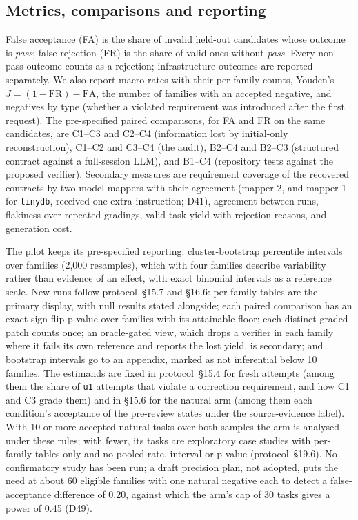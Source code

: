 \subsection{Metrics, comparisons and reporting}
\label{sec:metrics}
False acceptance (FA) is the share of invalid held-out candidates whose outcome is \emph{pass}; false rejection (FR) is the share of valid ones without \emph{pass}. Every non-pass outcome counts as a rejection; infrastructure outcomes are reported separately. We also report macro rates with their per-family counts, Youden's $J=(1-\mathrm{FR})-\mathrm{FA}$, the number of families with an accepted negative, and negatives by type (whether a violated requirement was introduced after the first request). The pre-specified paired comparisons, for FA and FR on the same candidates, are C1--C3 and C2--C4 (information lost by initial-only reconstruction), C1--C2 and C3--C4 (the audit), B2--C4 and B2--C3 (structured contract against a full-session LLM), and B1--C4 (repository tests against the proposed verifier). Secondary measures are requirement coverage of the recovered contracts by two model mappers with their agreement (mapper 2, and mapper 1 for \texttt{tinydb}, received one extra instruction; D41), agreement between runs, flakiness over repeated gradings, valid-task yield with rejection reasons, and generation cost.

The pilot keeps its pre-specified reporting: cluster-bootstrap percentile intervals over families (2,000 resamples), which with four families describe variability rather than evidence of an effect, with exact binomial intervals as a reference scale. New runs follow protocol~\S15.7 and \S16.6: per-family tables are the primary display, with null results stated alongside; each paired comparison has an exact sign-flip p-value over families with its attainable floor; each distinct graded patch counts once; an oracle-gated view, which drops a verifier in each family where it fails its own reference and reports the lost yield, is secondary; and bootstrap intervals go to an appendix, marked as not inferential below 10 families. The estimands are fixed in protocol~\S15.4 for fresh attempts (among them the share of \texttt{u1} attempts that violate a correction requirement, and how C1 and C3 grade them) and in \S15.6 for the natural arm (among them each condition's acceptance of the pre-review states under the source-evidence label). With 10 or more accepted natural tasks over both samples the arm is analysed under these rules; with fewer, its tasks are exploratory case studies with per-family tables only and no pooled rate, interval or p-value (protocol~\S19.6). No confirmatory study has been run; a draft precision plan, not adopted, puts the need at about 60 eligible families with one natural negative each to detect a false-acceptance difference of 0.20, against which the arm's cap of 30 tasks gives a power of 0.45 (D49).

